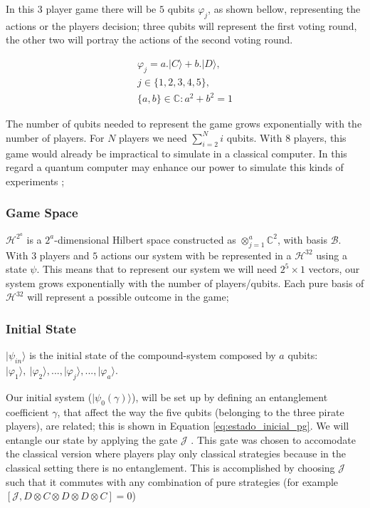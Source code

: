 \documentclass[10pt]{llncs}
\begin{document}
In this $3$ player game there will be $5$ qubits $\varphi_{j}$, as shown bellow, representing the actions or the players decision; three qubits will represent the first voting round, the other two will portray the actions of the second voting round. 

\begin{equation}
\begin{split}
\varphi_{j} = a . \vert C \rangle + b . \vert D \rangle , \\  j \in \{ 1, 2, 3, 4, 5 \}, \\ \{ a,b \} \in \mathbb{C} : a^2 + b^2 =1
\end{split}
\label{eq:opvarphiquantumstates}
\end{equation}

The number of qubits needed to represent the game grows exponentially with the number of players. For $N$ players we need $\sum_{i=2}^{N}{i}$ qubits. With 8 players, this game would already be impractical to simulate in a classical computer. In this regard a quantum computer may enhance our power to simulate this kinds of experiments \cite{Rieffel2011}; 

\subsubsection{Game Space} $\mathcal{H}^{2^{a}}$ is a $2^{a}$-dimensional Hilbert space constructed
as $\otimes_{j=1}^{a}\mathbb{C}^{2}$, with basis $\mathcal{B}$. With $3$ players and $5$ actions our system with be represented in a $\mathcal{H}^{32}$ using a state $\psi$. This means that to represent our system we will need $2^{5}\times 1$ vectors, our system grows exponentially with the number of players/qubits. Each pure basis  of $\mathcal{H}^{32}$ will represent a possible outcome in the game;

\subsubsection{Initial State} $\vert\psi_{in}\rangle$ is the initial state of the compound-system
composed by $a$ qubits: $\vert\varphi_{1}\rangle,\:\vert\varphi_{2}\rangle, ..., \vert\varphi_{j}\rangle, ..., \vert\varphi_{a}\rangle$.

Our initial system ($\vert \psi_{0}(\gamma) \rangle$), will be set up by defining an entanglement coefficient $\gamma$, that affect the way the five qubits (belonging to the three pirate players), are related; this is shown in Equation \eqref{eq:estado_inicial_pg}. 
We will entangle our state by applying the gate $\mathcal{J}$ \cite{Letters2002}. This gate was chosen to accomodate the classical version where players play only classical strategies because in the classical setting there is no entanglement. This is accomplished by choosing $\mathcal{J}$ such that it commutes with any combination of pure strategies (for example $ [ \mathcal{J} , D \otimes C \otimes D \otimes D \otimes C ] = 0 $)
\end{document}
